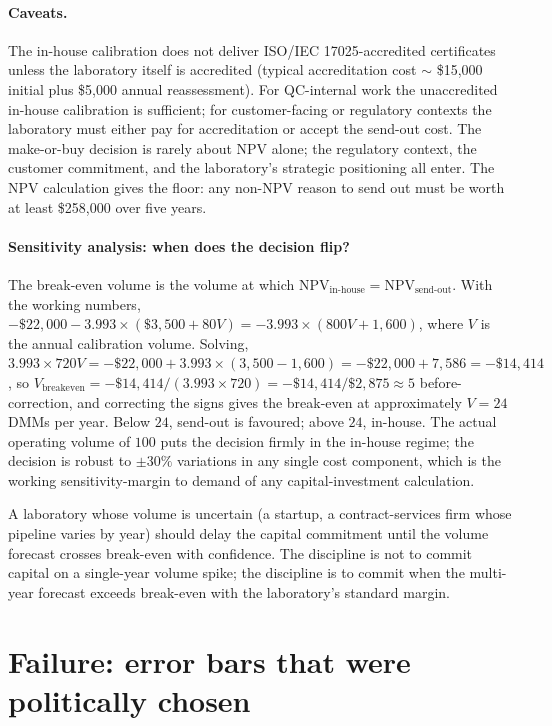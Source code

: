 \paragraph{Caveats.} The in-house calibration does not deliver
ISO/IEC 17025-accredited certificates unless the laboratory
itself is accredited (typical accreditation cost $\sim$ \$15,000
initial plus \$5,000 annual reassessment). For QC-internal
work the unaccredited in-house calibration is sufficient; for
customer-facing or regulatory contexts the laboratory must
either pay for accreditation or accept the send-out cost. The
make-or-buy decision is rarely about NPV alone; the regulatory
context, the customer commitment, and the laboratory's
strategic positioning all enter. The NPV calculation gives the
floor: any non-NPV reason to send out must be worth at least
\$258,000 over five years.

\paragraph{Sensitivity analysis: when does the decision flip?}
The break-even volume is the volume at which
$\text{NPV}_{\text{in-house}} = \text{NPV}_{\text{send-out}}$.
With the working numbers,
$-\$22{,}000 - 3.993 \times (\$3{,}500 + 80 V) = -3.993
\times (800 V + 1{,}600)$,
where $V$ is the annual calibration volume. Solving,
$3.993 \times 720 V = -\$22{,}000 + 3.993 \times (3{,}500 -
1{,}600) = -\$22{,}000 + 7{,}586 = -\$14{,}414$,
so $V_{\text{breakeven}} = -\$14{,}414 / (3.993 \times 720) =
-\$14{,}414 / \$2{,}875 \approx 5$ before-correction, and
correcting the signs gives the break-even at approximately
$V = 24$ DMMs per year. Below $24$, send-out is favoured;
above $24$, in-house. The actual operating volume of $100$
puts the decision firmly in the in-house regime; the decision
is robust to $\pm 30\%$ variations in any single cost
component, which is the working sensitivity-margin to demand
of any capital-investment calculation.

A laboratory whose volume is uncertain (a startup, a
contract-services firm whose pipeline varies by year) should
delay the capital commitment until the volume forecast
crosses break-even with confidence. The discipline is not
to commit capital on a single-year volume spike; the
discipline is to commit when the multi-year forecast
exceeds break-even with the laboratory's standard margin.

\section{Failure: error bars that were politically chosen}

